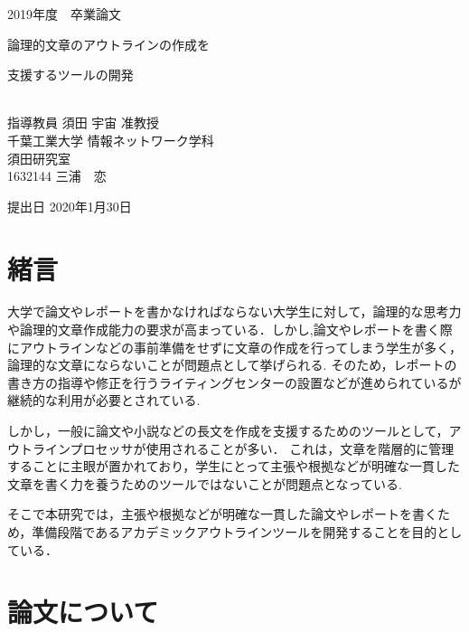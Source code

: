 \documentclass[a4j,12pt]{jarticle}
\begin{document}
\begin{center}
\thispagestyle{empty}
\vspace*{5zh}
\huge
2019年度　卒業論文\\[50pt]
{\Huge 論理的文章のアウトラインの作成を

支援するツールの開発}\\
[80pt]
\huge
指導教員 須田 宇宙 准教授\\[30pt]
千葉工業大学 情報ネットワーク学科\\[10pt]
須田研究室\\[60pt]
1632144 \hspace{70pt} 三浦　恋\\[75pt]
\end{center}
\vspace*{-2cm}
\begin{flushright} 
\huge
提出日 2020年1月30日
\end{flushright}

\newpage
{}
\tableofcontents%
\newpage
{}
\listoffigures
\thispagestyle{empty}
\clearpage
\addtocounter{page}{-1}

\newpage

\section{緒言}

大学で論文やレポートを書かなければならない大学生に対して，論理的な思考力や論理的文章作成能力の要求が高まっている．しかし,論文やレポートを書く際にアウトラインなどの事前準備をせずに文章の作成を行ってしまう学生が多く，論理的な文章にならないことが問題点として挙げられる.
そのため，レポートの書き方の指導や修正を行うライティングセンターの設置などが進められているが継続的な利用が必要とされている.

しかし，一般に論文や小説などの長文を作成を支援するためのツールとして，アウトラインプロセッサが使用されることが多い．
これは，文章を階層的に管理することに主眼が置かれており，学生にとって主張や根拠などが明確な一貫した文章を書く力を養うためのツールではないことが問題点となっている.

そこで本研究では，主張や根拠などが明確な一貫した論文やレポートを書くため，準備段階であるアカデミックアウトラインツールを開発することを目的としている．
\newpage
\section{論文について}
\end{document}
